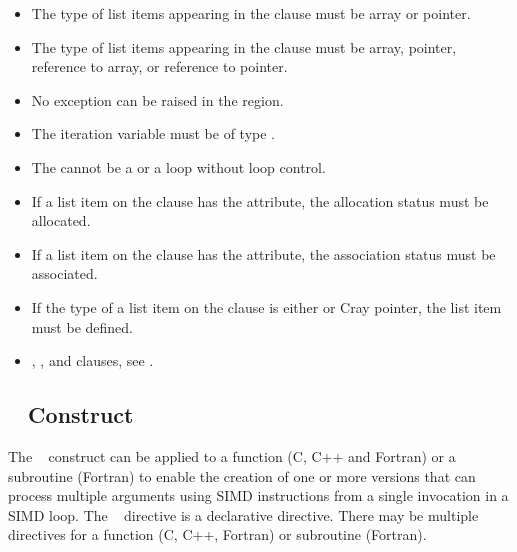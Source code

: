 \begin{itemize}
\cspecificstart
\item The type of list items appearing in the  clause must be array or pointer.
\cspecificend

\cppspecificstart
\item The type of list items appearing in the  clause must be array, pointer, 
reference to array, or reference to pointer. 

\item No exception can be raised in the  region. 
\cppspecificend

\fortranspecificstart
\item The  iteration variable must be of type .

\item The  cannot be a  or a  loop without loop control. 

\item If a list item on the  clause has the
   attribute, the allocation status must be
  allocated.

\item If a list item on the  clause has the
   attribute, the association status must be associated.

\item If the type of a list item on the  clause is
  either  or Cray pointer, the list item must be defined.

\fortranspecificend
\end{itemize}

\crossreferences
\begin{itemize}
\item {}, ,  and  clauses, see 
.
\end{itemize}








\subsection{~ Construct}
\label{subsec:declare simd Construct}
\summary
The ~ construct can be applied to a function (C, C++ and Fortran) or a 
subroutine (Fortran) to enable the creation of one or more versions that can process 
multiple arguments using SIMD instructions from a single invocation in a SIMD 
loop. The ~ directive is a declarative directive. There may be multiple 
~ directives for a function (C, C++, Fortran) or subroutine (Fortran).

